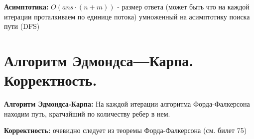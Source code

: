 \begin{figure}[h]
\begin{minipage}[h]{0.3\linewidth}
\end{minipage}
\end{figure}
\par \textbf{Асимптотика:} $O(ans \cdot (n+m))$ - размер ответа (может быть что на каждой итерации проталкиваем по единице потока) умноженный на асимптотику поиска пути (DFS)

\setcounter{section}{76}
\section{Алгоритм Эдмондса—Карпа. Корректность.}
\par \textbf{Алгоритм Эдмондса-Карпа:} На каждой итерации алгоритма Форда-Фалкерсона находим путь, кратчайший по количеству ребер в нем.
\par \textbf{Корректность:} очевидно следует из теоремы Форда-Фалкерсона (см. билет 75)

\setcounter{section}{77}
